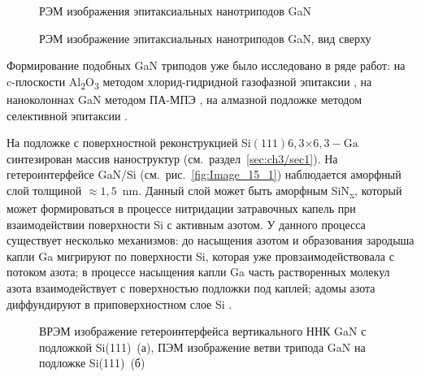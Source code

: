 \begin{figure}[ht] 
			 \caption{РЭМ изображения
		эпитаксиальных нанотриподов GaN}\label{fig:Image_14_12} \end{figure}

\begin{figure}[ht]   \caption{РЭМ изображение эпитаксиальных
нанотриподов GaN, вид сверху}\label{fig:Image_14_3} \end{figure}

Формирование подобных GaN триподов уже было исследовано в ряде работ: на
c-плоскости Al\textsubscript{2}O\textsubscript{3} методом хлорид-гидридной
газофазной эпитаксии \cite{Lee2010}, на наноколоннах GaN методом ПА-МПЭ
\cite{Wang2017}, на алмазной подложке методом селективной эпитаксии
\cite{Schuster2015}.

На подложке с поверхностной реконструкцией Si\((111)6,3\)\(\times\)\(6,3 -
\text{Ga}\) синтезирован массив наноструктур (см.~раздел~\cref{sec:ch3/sec1}).
На гетероинтерфейсе GaN/Si (см.~рис.~\cref{fig:Image_15_1}) наблюдается
аморфный слой толщиной \(\approx 1,5\)~\si{\nano\meter}. Данный слой может быть
аморфным SiN\textsubscript{x}, который может формироваться в процессе
нитридации затравочных капель при взаимодействии поверхности Si с активным
азотом. У данного процесса существует несколько механизмов: до насыщения азотом
и образования зародыша капли Ga мигрируют по поверхности Si, которая уже
провзаимодействовала с потоком азота; в процессе насыщения капли Ga часть
растворенных молекул азота взаимодействует с поверхностью подложки под каплей;
адомы азота диффундируют в приповерхностном слое Si \cite{Rawdanowicz2004}.

\begin{figure}[ht]  \caption{ВРЭМ изображение
		гетероинтерфейса вертикального ННК GaN с подложкой Si(111)~(а), ПЭМ
	изображение ветви трипода GaN на подложке Si(111)~(б)}\label{fig:Image_15}
\end{figure}

